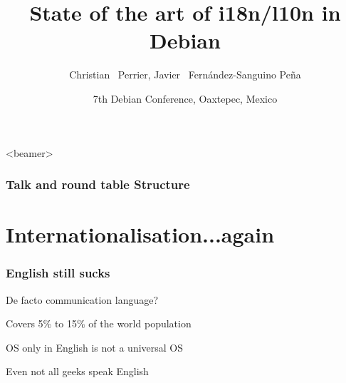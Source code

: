 \documentclass{beamer}
\title[State of the art of i18n/l10n in Debian] 
{State of the art of i18n/l10n in Debian}
\author[bubulle,jfs]
{Christian ~Perrier, Javier ~Fernández-Sanguino Peña}
\date[Debconf 6] 
{7th Debian Conference, Oaxtepec, Mexico}
\begin{document}
\frame{\titlepage}

\begin{frame}<beamer>
    \frametitle{Talk and round table Structure}
    \tableofcontents[subsectionstyle=hide]
\end{frame}

\section{Internationalisation...again}


\begin{frame}
  \frametitle{English still sucks}
	\begin{block}
		{De facto communication language?}
	\end{block}
	\begin{block}
		{Covers 5\% to 15\% of the world population}
	\end{block}
	\begin{block}
		{OS only in English is not a universal OS}
	\end{block}
	\begin{block}
		{Even not all geeks speak English}
	\end{block}
\end{frame}
\end{document}

